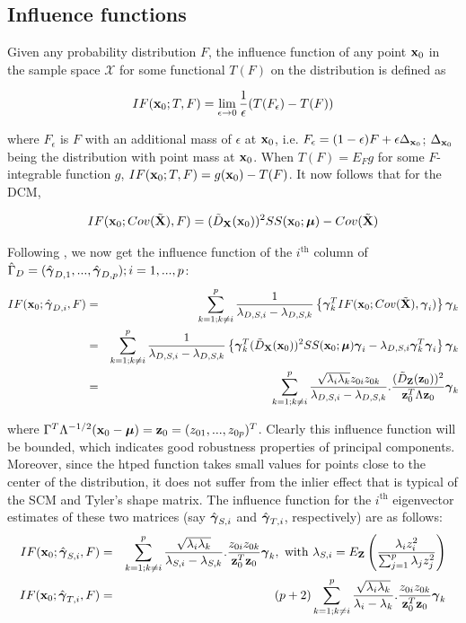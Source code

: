 \documentclass[fleqn,12pt]{article}
\begin{document}
\subsection{Influence functions}
Given any probability distribution $F$, the influence function of any point ${\bf{x}}_0$ in the sample space $\mathcal{X}$ for some functional $T(F)$ on the distribution is defined as

$$ IF({\bf{x}}_0; T,F) = \lim_{\epsilon \rightarrow 0} \frac{1}{\epsilon} (T(F_\epsilon) - T(F)) $$

where $F_\epsilon$ is $F$ with an additional mass of $\epsilon$ at ${\bf{x}}_0$, i.e. $F_\epsilon = (1-\epsilon)F + \epsilon \Delta_{{\bf{x}}_0}$; $\Delta_{{\bf{x}}_0}$ being the distribution with point mass at ${\bf{x}}_0$. When $T(F) = E_F g$ for some $F$-integrable function $g$, $IF({\bf{x}}_0; T,F) = g({\bf{x}}_0) - T(F)$. It now follows that for the DCM,

$$ IF({\bf{x}}_0; Cov(\tilde {{\mathbf{X}}}), F) = (\tilde D_{\mathbf{X}}({\bf{x}}_0))^2 SS({\bf{x}}_0; {\boldsymbol{\mu}}) - Cov(\tilde {{\mathbf{X}}}) $$

Following \cite{croux00}, we now get the influence function of the $i^\text{th}$ column of $\hat\Gamma_D = (\hat{{\boldsymbol{\gamma}}}_{D,1},...,\hat{{\boldsymbol{\gamma}}}_{D,p}); i = 1,...,p$:
\begin{eqnarray}
IF({\bf{x}}_0; \hat{{\boldsymbol{\gamma}}}_{D,i}, F) &=& \sum_{k=1; k \neq i}^p \frac{1}{\lambda_{D,S,i} - \lambda_{D,S,k}} \left\{ {\boldsymbol{\gamma}}^T_k IF({\bf{x}}_0; Cov(\tilde {{\mathbf{X}}}), {\boldsymbol{\gamma}}_i) \right\} {\boldsymbol{\gamma}}_k \notag \\
&=& \sum_{k=1; k \neq i}^p \frac{1}{\lambda_{D,S,i} - \lambda_{D,S,k}} \left\{ {\boldsymbol{\gamma}}^T_k (\tilde D_{\mathbf{X}}({\bf{x}}_0))^2 SS({\bf{x}}_0; {\boldsymbol{\mu}}){\boldsymbol{\gamma}}_i - \lambda_{D,S,i}{\boldsymbol{\gamma}}_k^T{\boldsymbol{\gamma}}_i \right\} {\boldsymbol{\gamma}}_k \notag \\
&=& \sum_{k=1; k \neq i}^p \frac{\sqrt{\lambda_i \lambda_k} z_{0i} z_{0k}}{\lambda_{D,S,i} - \lambda_{D,S,k}}. \frac{(\tilde D_{\mathbf{Z}}({\bf{z}}_0))^2 }{{\bf{z}}_0^T \Lambda {\bf{z}}_0} {\boldsymbol{\gamma}}_k
\end{eqnarray}

where $\Gamma^T \Lambda^{-1/2} ({\bf{x}}_0 - {\boldsymbol{\mu}}) = {\bf{z}}_0 = (z_{01},...,z_{0p})^T$. Clearly this influence function will be bounded, which indicates good robustness properties of principal components. Moreover, since the htped function takes small values for points close to the center of the distribution, it does not suffer from the inlier effect that is typical of the SCM and Tyler's shape matrix. The influence function for the $i^\text{th}$ eigenvector estimates of these two matrices (say $\hat{{\boldsymbol{\gamma}}}_{S,i}$ and $\hat{{\boldsymbol{\gamma}}}_{T,i}$, respectively) are as follows:
\begin{eqnarray*}
\quad IF({\bf{x}}_0; \hat {{\boldsymbol{\gamma}}}_{S,i}, F) &=& \sum_{k=1; k \neq i}^p \frac{\sqrt{\lambda_i \lambda_k}}{\lambda_{S,i} - \lambda_{S,k}}. \frac{z_{0i} z_{0k}}{{\bf{z}}_0^T {\bf{z}}_0} {\boldsymbol{\gamma}}_k, \text{ with } \lambda_{S,i} = E_{\mathbf{Z}} \left( \frac{\lambda_i z_i^2}{\sum_{j=1}^p \lambda_j z_j^2} \right) \quad \\
IF({\bf{x}}_0; \hat {{\boldsymbol{\gamma}}}_{T,i}, F) &=& (p+2) \sum_{k=1; k \neq i}^p \frac{\sqrt{\lambda_i \lambda_k}}{\lambda_i - \lambda_k}. \frac{z_{0i} z_{0k}}{{\bf{z}}_0^T {\bf{z}}_0} {\boldsymbol{\gamma}}_k \quad 
\end{eqnarray*}
\end{document}
